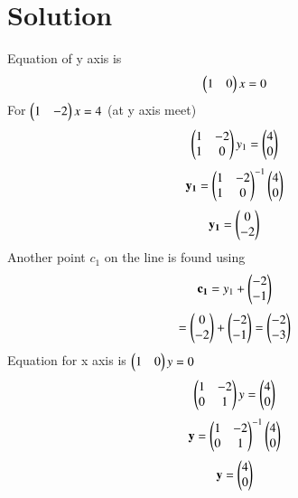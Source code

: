\documentclass[journal,12pt,twocolumn]{IEEEtran}
\begin{document}
\section{Solution}
Equation of y axis is 
\begin{align}
    \begin{pmatrix}1 & 0\end{pmatrix}x = 0
\end{align}
For   $\begin{pmatrix}
1 & -2 \\
\end{pmatrix}x = 4$ (at y axis meet)
\begin{align}
    \begin{pmatrix}
1 & -2\\
1 & 0 
\end{pmatrix}y_1 =  \begin{pmatrix} 4\\
0
\end{pmatrix}
\end{align}
\begin{align}
  \mathbf{y_1} =  \begin{pmatrix}
1 & -2\\
1 & 0 
\end{pmatrix}^{-1}\begin{pmatrix} 4\\
0
\end{pmatrix}
\end{align}
\begin{align}
    \mathbf{y_1} =  \begin{pmatrix} 0\\
-2
\end{pmatrix}
\end{align}
Another point $c_1$ on the line is found using 
\begin{align}
\mathbf{c_1} = y_1 + \begin{pmatrix} -2\\
-1
\end{pmatrix}
\end{align}
\begin{align}
    = \begin{pmatrix} 0\\
-2
\end{pmatrix} + \begin{pmatrix} -2\\
-1
\end{pmatrix} = \begin{pmatrix} -2\\
-3
\end{pmatrix}
\end{align}
Equation for x axis is $\begin{pmatrix}1 & 0\end{pmatrix}y=0$
\begin{align}
    \begin{pmatrix}
1 & -2\\
0 & 1 
\end{pmatrix}y =  \begin{pmatrix} 4\\
0
\end{pmatrix}
\end{align}
\begin{align}
    \mathbf{y} =  \begin{pmatrix}
1 & -2\\0 & 1 
\end{pmatrix}^{-1}\begin{pmatrix} 4\\
0
\end{pmatrix}
\end{align}
\begin{align}
    \mathbf{y} = 
\begin{pmatrix} 4\\
0
\end{pmatrix}
\end{align}
\end{document}
